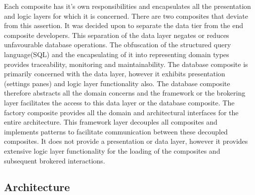 		\vspace{5mm}
		\normalsize
		{			
			Each composite has it's own responsibilities and encapsulates all the presentation and logic layers 
			for which it is concerned.  There are two composites that deviate from this assertion.
			\newline
			\newline
			It was decided upon to separate the data tier from the end composite developers.
			This separation of the data layer negates or reduces unfavourable database operations.
			The obfuscation of the structured query language(SQL) and the encapsulating of it into representing domain types provides traceability,
			monitoring and maintainability.
			\newline
			\newline
			The database composite is primarily concerned with the data layer, however it exhibits presentation (settings panes)
			and logic layer functionality also.  The database composite therefore abstracts all the domain concerns and the framework or the brokering layer 
			facilitates the access to this data layer or the database composite.
			\newline
			\newline
			The factory composite provides all the domain and architectural interfaces for the entire architecture.
			This framework layer decouples all composites and implements patterns to facilitate communication between these decoupled composites. 
			It does not provide a presentation or data layer, however it provides extensive logic layer functionality for the loading of the composites
			and subsequent brokered interactions.	
		}
		
\newpage
	
	\subsection{Architecture}		
				
